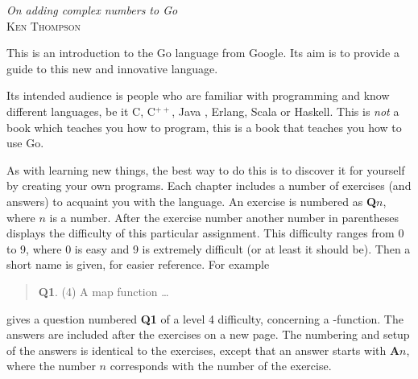 {\textit{On adding complex numbers to Go}\\ \textsc{Ken Thompson}}

\noindent{}This is an introduction to the Go language from Google. Its aim
is to provide a guide to this new and innovative language. 

Its intended audience is people who are familiar with programming
and know different languages, be it C\cite{c}, C$^{++}$\cite{c++}, 
Java \cite{java}, Erlang\cite{erlang}, Scala\cite{scala} or
Haskell\cite{haskell}. This is \emph{not} a book which teaches you how to 
program, this is a book that teaches you how to use Go.

As with
learning new things, the best way to do this is to discover it for
yourself by creating your own programs.
Each chapter includes a number of exercises (and answers)
to acquaint you with the language.
An exercise
is numbered as \textbf{Q$n$}, where $n$ is a number. After the
exercise number another number in parentheses displays the difficulty
of this particular assignment. This difficulty ranges from 0 to 9, where
0 is easy and 9 is extremely difficult (or at least it should be).
Then a short name is given, for easier reference.
For example
\begin{verse}
\textbf{Q1}. (4) A map function \ldots
\end{verse}
    
gives a question numbered \textbf{Q1} of a level 4 difficulty, concerning a
-function. The answers are included after the exercises on a
new page.
The numbering and setup of the answers is identical to the
exercises, except that an answer starts with \textbf{A$n$}, where the
number $n$ corresponds with the number of the exercise.

